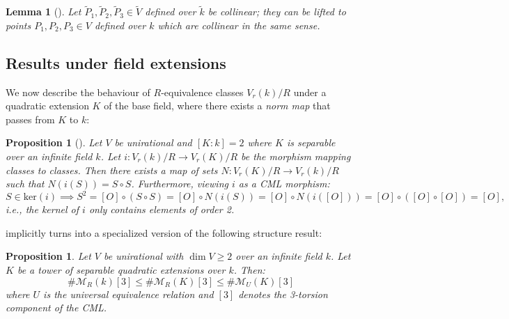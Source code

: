 \documentclass[11pt]{article}
\newtheorem{lemma}[theorem]{Lemma}
\newtheorem{proposition}[theorem]{Proposition}
\theoremstyle{definition}
\newcommand{\tV}{\tilde{V}}
\newcommand{\tk}{\tilde{k}}
\begin{document}
\begin{lemma}[{\cite[Lem.~14]{swinnertondyer}}]
\label{thm:swd-14}
Let $\tilde{P}_1, \tilde{P}_2, \tilde{P}_3 \in \tV$ defined over $\tk$ be collinear; they can be lifted to points $P_1, P_2, P_3 \in V$ defined over $k$ which are collinear in the same sense. 
\end{lemma}

\subsection{Results under field extensions}

We now describe the behaviour of $R$-equivalence classes $V_r(k)/R$ under a quadratic extension $K$ of the base field, where there exists a \textit{norm map} that passes from $K$ to $k$:

\begin{proposition}[{\cite[Prop.~15.1-15.1.1]{manin3}}]
\label{thm:inverse-map}
Let $V$ be unirational and $[K:k]=2$ where $K$ is separable over an infinite field $k$. Let $i: V_r(k)/R \to V_r(K)/R$ be the morphism mapping classes to classes. Then there exists a map of sets $N : V_r(K)/R  \to V_r(k)/R$ such that $N(i(S)) = S \circ S$. Furthermore, viewing $i$ as a CML morphism:
\[
S \in \text{ker}(i) \implies S^2 = [O] \circ (S \circ S) = [O] \circ N(i(S)) = [O] \circ N(i([O])) = [O] \circ ([O] \circ [O]) = [O],
\]
i.e., the kernel of $i$ only contains elements of order 2.
\end{proposition}

\cite[Prop.~5.1]{dkbrauer} implicitly turns  into a specialized version of the following structure result:

\begin{proposition}
\label{thm:RU}
Let $V$ be unirational with $\dim V \ge 2$ over an infinite field $k$. Let $K$ be a tower of separable quadratic extensions over $k$. Then:
\begin{equation}
\label{eq_RU}
    \#\mathcal{M}_R(k)[3] \leq \#\mathcal{M}_R(K)[3] \leq \#\mathcal{M}_U(K)[3]
\end{equation}
where $U$ is the universal equivalence relation and $[3]$ denotes the 3-torsion component of the CML.
\end{proposition}
\end{document}
